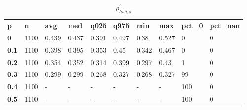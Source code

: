 \begin{table}[h]
 \centering 
\footnotesize
\caption{$\rho_{hsg,s}^\prime $}
\label{tab:alphahsgs}
\begin{tabular}[h]{| l l l l l l l l l l|
    } \hline
\textbf{ p} & \textbf{ n} & \textbf{ avg} & \textbf{ med} & \textbf{ q025} & \textbf{ q975} & \textbf{ min} & \textbf{ max} & \textbf{ pct\_0} & \textbf{ pct\_nan}
           \\
  \textbf{  0} & 1100 & 0.439 & 0.437 & 0.391 & 0.497 &  0.38 & 0.527 &   0 & 0
           \\
  \textbf{0.1} & 1100 & 0.398 & 0.395 & 0.353 &  0.45 & 0.342 & 0.467 &   0 & 0
           \\
  \textbf{0.2} & 1100 & 0.354 & 0.352 & 0.314 & 0.399 & 0.297 &  0.43 &   1 & 0
           \\
  \textbf{0.3} & 1100 & 0.299 & 0.299 & 0.268 & 0.327 & 0.268 & 0.327 &  99 & 0
           \\
  \textbf{0.4} & 1100 & - & - & - & - & - & - & 100 & 0
           \\
  \textbf{0.5} & 1100 & - & - & - & - & - & - & 100 & 0
           \\
 \hline \end{tabular}
 \end{table}
